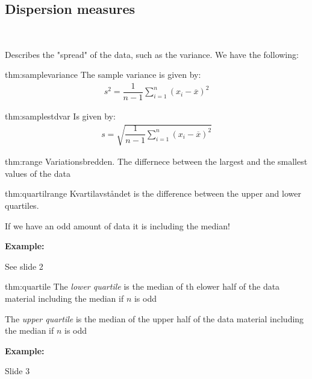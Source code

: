 \subsection{Dispersion measures}\hfill\\\par
\noindent Describes the "spread" of the data, such as the variance. We have the following:
\par\bigskip
\begin{theo}{thm:samplevariance}
  The sample variance is given by:
  \begin{equation*}
    \begin{gathered}
      s^2 = \dfrac{1}{n-1}\sum_{i=1}^{n}(x_i-\overline{x})^2
    \end{gathered}
  \end{equation*}
\end{theo}
\newpage
\begin{theo}{thm:samplestdvar}
  Is given by:
  \begin{equation*}
    \begin{gathered}
      s = \sqrt{\dfrac{1}{n-1}\sum_{i=1}^{n}(x_i-\overline{x})^2}
    \end{gathered}
  \end{equation*}
\end{theo}
\begin{theo}[Range]{thm:range}
  Variationsbredden. The differnece between the largest and the smallest values of the data 
\end{theo}
\par\bigskip
\begin{theo}{thm:quartilrange}
  Kvartilavståndet is the difference between the upper and lower quartiles.\par
  \noindent If we have an odd amount of data it is including the median!
\end{theo}
\par\bigskip
\noindent\textbf{Example:}\par
\noindent See slide 2
\par\bigskip
\begin{theo}{thm:quartile}
  The \textit{lower quartile} is the median of th elower half of the data material including the median if $n$ is odd
  \par\bigskip
  \noindent The \textit{upper quartile} is the median of the upper half of the data material including the median if $n$ is odd
\end{theo}
\par\bigskip
\noindent\textbf{Example:}\par
\noindent Slide 3
\par\bigskip
